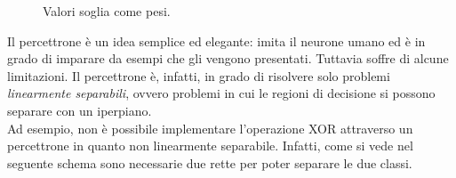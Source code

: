 \begin{figure}[h!]
    \centering
    \caption{Valori soglia come pesi.}
\end{figure}

\newpage

Il percettrone è un idea semplice ed elegante: imita il neurone umano ed è in grado di imparare da esempi che gli vengono presentati. Tuttavia soffre di alcune limitazioni. Il percettrone è, infatti, in grado di risolvere solo problemi \emph{linearmente separabili}, ovvero problemi in cui le regioni di decisione si possono separare con un iperpiano.\\

Ad esempio, non è possibile implementare l'operazione XOR attraverso un percettrone in quanto non linearmente separabile. Infatti, come si vede nel seguente schema sono necessarie due rette per poter separare le due classi.

